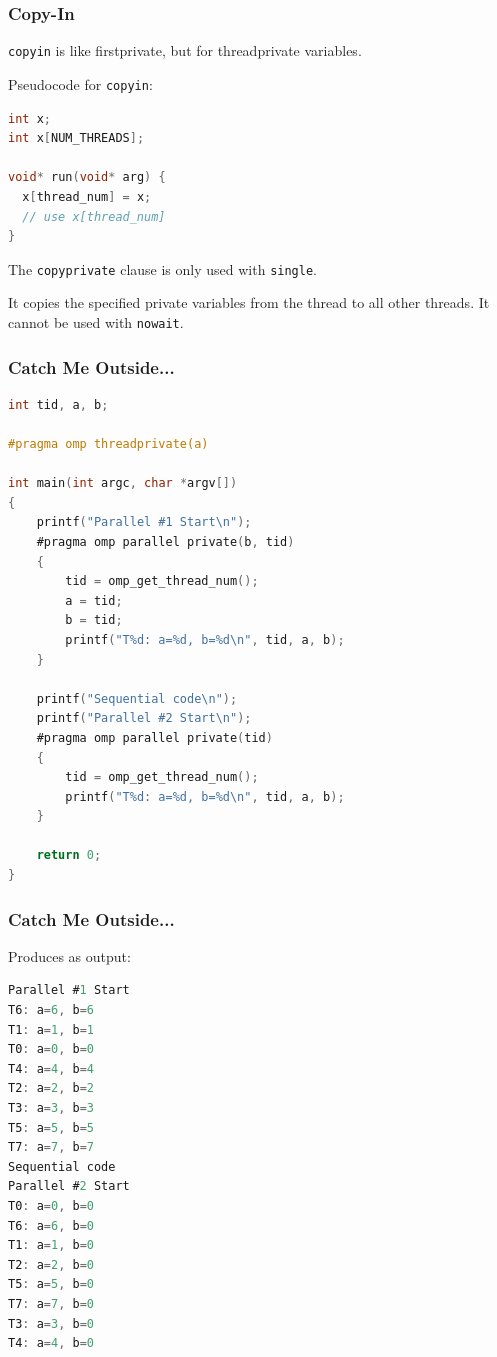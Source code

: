 \begin{frame}[fragile]
\frametitle{Copy-In}

{\tt copyin} is like firstprivate, but for threadprivate variables.

Pseudocode for {\tt copyin}:
  \begin{lstlisting}[language=C]
int x;
int x[NUM_THREADS];

void* run(void* arg) {
  x[thread_num] = x;
  // use x[thread_num]
}
  \end{lstlisting}

The {\tt copyprivate} clause is only used with {\tt single}.


It copies the specified private variables from the thread to all other
threads. It cannot be used with {\tt nowait}.

\end{frame}



\begin{frame}[fragile]
\frametitle{Catch Me Outside...}

\begin{lstlisting}[language=C,morekeywords={foreach,pragma,omp,parallel,single,nowait,task,untied,barrier,taskyield}]
int tid, a, b;

#pragma omp threadprivate(a)

int main(int argc, char *argv[])
{
    printf("Parallel #1 Start\n");
    #pragma omp parallel private(b, tid)
    {
        tid = omp_get_thread_num();
        a = tid;
        b = tid;
        printf("T%d: a=%d, b=%d\n", tid, a, b);
    }

    printf("Sequential code\n");
    printf("Parallel #2 Start\n");
    #pragma omp parallel private(tid)
    {
        tid = omp_get_thread_num();
        printf("T%d: a=%d, b=%d\n", tid, a, b);
    }

    return 0;
}    
  \end{lstlisting}

\end{frame}


\begin{frame}[fragile]
\frametitle{Catch Me Outside...}

Produces as output: 
\begin{lstlisting}[language=C,morekeywords={foreach,pragma,omp,parallel,single,nowait,task,untied,barrier,taskyield}]
% ./a.out
Parallel #1 Start
T6: a=6, b=6
T1: a=1, b=1
T0: a=0, b=0
T4: a=4, b=4
T2: a=2, b=2
T3: a=3, b=3
T5: a=5, b=5
T7: a=7, b=7
Sequential code
Parallel #2 Start
T0: a=0, b=0
T6: a=6, b=0
T1: a=1, b=0
T2: a=2, b=0
T5: a=5, b=0
T7: a=7, b=0
T3: a=3, b=0
T4: a=4, b=0
\end{lstlisting}



\end{frame}





